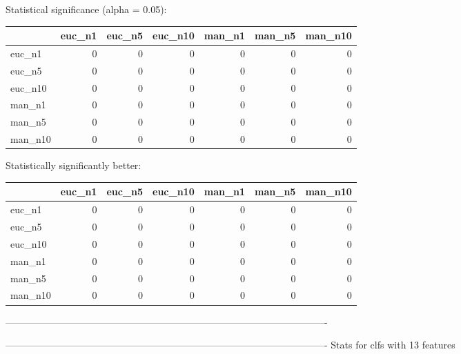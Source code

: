Statistical significance (alpha = 0.05):
 \begin{tabular}{lrrrrrr}
\hline
         &   euc\_n1 &   euc\_n5 &   euc\_n10 &   man\_n1 &   man\_n5 &   man\_n10 \\
\hline
 euc\_n1  &        0 &        0 &         0 &        0 &        0 &         0 \\
 euc\_n5  &        0 &        0 &         0 &        0 &        0 &         0 \\
 euc\_n10 &        0 &        0 &         0 &        0 &        0 &         0 \\
 man\_n1  &        0 &        0 &         0 &        0 &        0 &         0 \\
 man\_n5  &        0 &        0 &         0 &        0 &        0 &         0 \\
 man\_n10 &        0 &        0 &         0 &        0 &        0 &         0 \\
\hline
\end{tabular} 

Statistically significantly better:
 \begin{tabular}{lrrrrrr}
\hline
         &   euc\_n1 &   euc\_n5 &   euc\_n10 &   man\_n1 &   man\_n5 &   man\_n10 \\
\hline
 euc\_n1  &        0 &        0 &         0 &        0 &        0 &         0 \\
 euc\_n5  &        0 &        0 &         0 &        0 &        0 &         0 \\
 euc\_n10 &        0 &        0 &         0 &        0 &        0 &         0 \\
 man\_n1  &        0 &        0 &         0 &        0 &        0 &         0 \\
 man\_n5  &        0 &        0 &         0 &        0 &        0 &         0 \\
 man\_n10 &        0 &        0 &         0 &        0 &        0 &         0 \\
\hline
\end{tabular} 

----------------------------------------------------------------------------------------------------



----------------------------------------------------------------------------------------------------
Stats for clfs with 13 features



